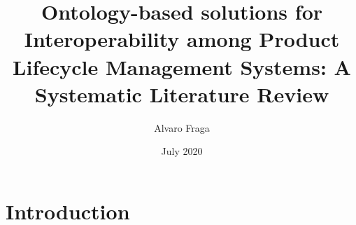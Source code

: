 \documentclass{article}
\title{Ontology-based solutions for Interoperability among Product Lifecycle Management Systems: A Systematic Literature Review}
\author{Alvaro Fraga}
\date{July 2020}
\begin{document}
\maketitle

\section{Introduction}
\end{document}
